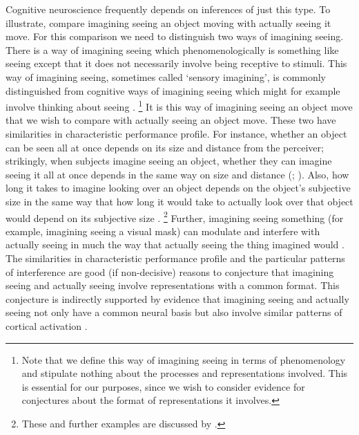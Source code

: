\documentclass[12pt,\papersize]{extarticle}
\begin{document}
Cognitive neuroscience frequently depends on inferences of just this type.
To illustrate, compare imagining seeing an object moving with actually seeing it move. For this comparison we need to distinguish two ways of imagining seeing. There is a way of imagining seeing which phenomenologically is something like seeing except that it does not necessarily involve being receptive to stimuli. This way of imagining seeing, sometimes called `sensory imagining', is commonly distinguished from cognitive ways of imagining seeing which might for example involve thinking about seeing \citep[§2.1]{Gendler:2011_imagination}.%
\footnote{Note that we define this way of imagining seeing in terms of phenomenology and stipulate nothing about the processes and representations involved.  This is essential for our purposes, since we wish to consider evidence for conjectures about the format of representations it involves.}
It is this way of imagining seeing an object move that we wish to compare with actually seeing an object move.  These two have similarities in characteristic performance profile.  For instance, whether an object can be seen all at once depends on its size and distance from the perceiver; strikingly, when subjects imagine seeing an object, whether they can imagine seeing it all at once depends in the same way on size and distance (\citealp{kosslyn:1978_measuring}; \citealp[p.\ 99ff]{kosslyn:1994_image}).  Also, how long it takes to imagine looking over an object depends on the object's subjective size in the same way that how long it would take to actually look over that object would depend on its subjective size \citep{kosslyn:1978_visual}.%
\footnote{These and further examples are discussed by \citet[p.\ 165]{currie:1997_mental}.
} 
Further, imagining seeing something (for example, imagining seeing a visual mask) can modulate and interfere with actually seeing in much the way that actually seeing the thing imagined would \citep{pearson:2008_functional, ishai:1995_common}. 
The similarities in characteristic performance profile and the particular patterns of interference are good (if non-decisive) reasons to conjecture that imagining seeing and actually seeing involve representations with a common format. 
This conjecture is indirectly supported by evidence that imagining seeing and actually seeing not only have a common neural basis but also involve similar patterns of cortical activation \citep[e.g.][]{page:2011_erp}.
\end{document}
